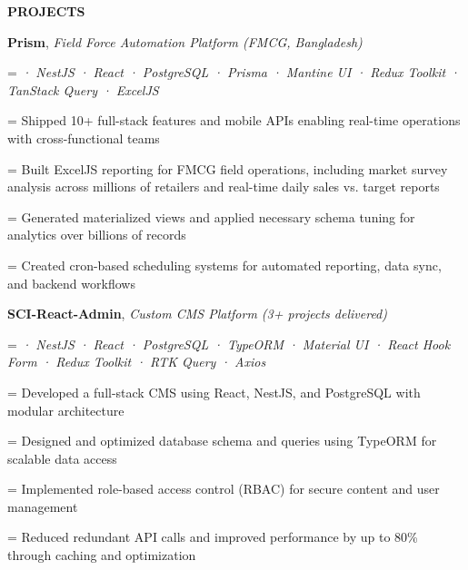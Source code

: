 \documentclass[a4paper]{article}
\newcommand{\bodyfont}{%
  \fontsize{11pt}{13pt}\selectfont
}
\newcommand{\sectionfont}{%
  \fontsize{12pt}{14pt}\selectfont\bfseries
}
\newlength{\secondaryindent}
\newlength{\listindent}
\newcommand{\sectiontitle}[1]{%
  \par
  \vspace{14pt}
  {\sectionfont #1}\par
  \vspace{6pt}
}
\newlength{\bulletgap}
\newcommand{\resumebullet}[1]{%
  \begingroup
  \leftskip=\listindent
  \parindent=0pt
  \noindent
  \llap{%
    \raisebox{0.15ex}{%
      \fontsize{7}{7}\selectfont -
    }%
    \hspace{6pt}%
  }%
  #1\par
  \endgroup
  \vspace{\bulletgap}%
}
\newcommand{\secondaryline}[1]{%
  \par
  \begingroup
  \leftskip=\secondaryindent
  \noindent
  #1\par
  \endgroup
}
\newcommand{\projecttitle}[2]{%
  \textbf{#1}, \textit{#2}\par
}
\newcommand{\projecttech}[1]{%
  \secondaryline{\textit{#1}}%
}
\begin{document}

\newpage
\setlength{\bulletgap}{2pt}

\vspace*{-12pt}

\bodyfont


\sectiontitle{PROJECTS}

\projecttitle
{Prism}
{Field Force Automation Platform (FMCG, Bangladesh)}

\projecttech{· NestJS · React · PostgreSQL · Prisma · Mantine UI · Redux Toolkit · TanStack Query · ExcelJS}

\vspace{7.64pt}

\resumebullet{Shipped 10+ full-stack features and mobile APIs enabling real-time operations with cross-functional teams}

\resumebullet{Built ExcelJS reporting for FMCG field operations, including market survey analysis across millions of retailers and real-time daily sales vs. target reports}

\resumebullet{Generated materialized views and applied necessary schema tuning for analytics over billions of records}

\resumebullet{Created cron-based scheduling systems for automated reporting, data sync, and backend workflows}

\vspace{6pt}

\projecttitle
{SCI-React-Admin}
{Custom CMS Platform (3+ projects delivered)}

\projecttech{· NestJS · React · PostgreSQL · TypeORM · Material UI · React Hook Form · Redux Toolkit · RTK Query · Axios}

\vspace{7.64pt}

\resumebullet{Developed a full-stack CMS using React, NestJS, and PostgreSQL with modular architecture}

\resumebullet{Designed and optimized database schema and queries using TypeORM for scalable data access}

\resumebullet{Implemented role-based access control (RBAC) for secure content and user management}

\resumebullet{Reduced redundant API calls and improved performance by up to 80\% through caching and optimization}
\end{document}
